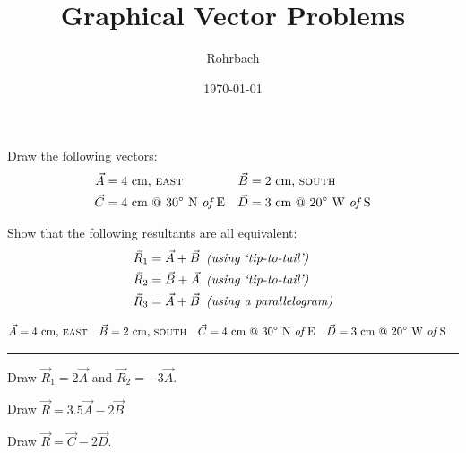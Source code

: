 \documentclass[10pt]{exam}
\title{Graphical Vector Problems}
\author{Rohrbach}
\date{\today}
\begin{document}
\maketitle

\begin{questions}
  

\question
  Draw the following vectors:
  \begin{align*}
    \vec{A} &= 4~\text{cm, \sc east} &
    \vec{B} &= 2~\text{cm, \sc south} \\
    \vec{C} &= 4~\text{cm @ } 30^\circ \text{ N {\it of} E} &
    \vec{D} &= 3~\text{cm @ } 20^\circ \text{ W {\it of} S}
  \end{align*}



\question
  Show that the following resultants are all equivalent:
  \begin{align*}
    \vec{R}_1 &= \vec{A} + \vec{B} 
    \,\,\, \text{\it (using `tip-to-tail')} \\
    \vec{R}_2 &= \vec{B} + \vec{A}
    \,\,\, \text{\it (using `tip-to-tail')} \\
    \vec{R}_3 &= \vec{A} + \vec{B} 
    \,\,\, \text{\it (using a parallelogram)}
  \end{align*}


  \pagebreak

\begin{EnvUplevel}
  \begin{align*}
    \vec{A} &= 4~\text{cm, \sc east} &
    \vec{B} &= 2~\text{cm, \sc south} &
    \vec{C} &= 4~\text{cm @ } 30^\circ \text{ N {\it of} E} &
    \vec{D} &= 3~\text{cm @ } 20^\circ \text{ W {\it of} S}
  \end{align*}
\end{EnvUplevel}

\hrule


\question
  Draw $\vec{R}_1=2\vec{A}$ and $\vec{R}_2=-3\vec{A}$.



\question
  Draw $\vec{R}=3.5\vec{A}-2\vec{B}$



\question
  Draw $\vec{R}=\vec{C}-2\vec{D}$.


\end{questions}
\end{document}
